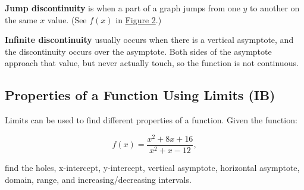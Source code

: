 \documentclass[12pt]{article}
\begin{document}
\textbf{Jump discontinuity} is when a part of a graph jumps from one $y$ to another on the same $x$ value. (See $f(x)$ in \hyperref[fig:limproperties]{Figure 2}.)

\textbf{Infinite discontinuity} usually occurs when there is a vertical asymptote, and the discontinuity occurs over the asymptote. Both sides of the asymptote approach that value, but never actually touch, so the function is not continuous.

\subsection{Properties of a Function Using Limits (IB)} %

Limits can be used to find different properties of a function. Given the function:

\[ f(x) = \frac{x^2 + 8x + 16}{x^2 + x - 12}, \]

\noindent find the holes, x-intercept, y-intercept, vertical asymptote, horizontal asymptote, domain, range, and increasing/decreasing intervals.
\end{document}
